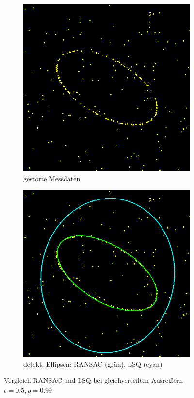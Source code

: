 
\begin{figure}[!htb]
	\centering
	\begin{subfigure}{.5\textwidth}
		\centering
		\includegraphics[width=.9\textwidth]{images/ransac50_0.png}
		\caption{gestörte Messdaten}
	\end{subfigure}%
	\begin{subfigure}{.5\textwidth}
		\centering
		\includegraphics[width=.9\textwidth]{images/ransac50_1.png}
		\caption{detekt. Ellipsen: RANSAC (grün), LSQ (cyan)}
	\end{subfigure}
	\label{fig:bla}
	\caption{Vergleich RANSAC und LSQ bei gleichverteilten Ausreißern $\epsilon = 0.5, p = 0.99$}
\end{figure}


